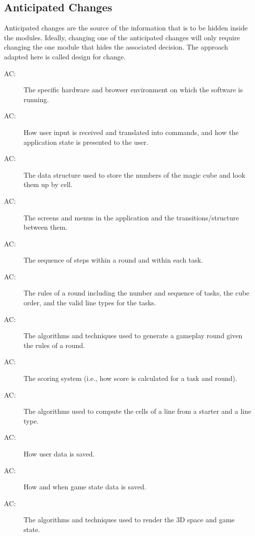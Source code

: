 \documentclass[12pt, titlepage]{article}
\newcounter{acnum}
\newcommand{\actheacnum}{AC\theacnum}
\begin{document}
\subsection{Anticipated Changes} \label{SecAchange}

Anticipated changes are the source of the information that is to be hidden
inside the modules. Ideally, changing one of the anticipated changes will only
require changing the one module that hides the associated decision. The approach
adapted here is called design for
change.

\begin{description}
\item [ \actheacnum \label{acHardware}:] The specific hardware and browser environment on which the software is running.
\item [ \actheacnum \label{acUI}:] How user input is received and translated into commands, and how the application state is presented to the user.
\item [ \actheacnum \label{acCR}:] The data structure used to store the numbers of the magic cube and look them up by cell.
\item [ \actheacnum \label{acN}:] The screens and menus in the application and the transitions/structure between them.
\item [ \actheacnum \label{acRC}:] The sequence of steps within a round and within each task.
\item [ \actheacnum \label{acR}:] The rules of a round including the number and sequence of tasks, the cube order, and the valid line types for the tasks.
\item [ \actheacnum \label{acRG}:] The algorithms and techniques used to generate a gameplay round given the rules of a round.
\item [ \actheacnum \label{acS}:] The scoring system (i.e., how score is calculated for a task and round).
\item [ \actheacnum \label{acTG}:] The algorithms used to compute the cells of a line from a starter and a line type.
\item [ \actheacnum \label{acUD}:] How user data is saved.
\item [ \actheacnum \label{acGD}:] How and when game state data is saved.
\item [ \actheacnum \label{acRE}:] The algorithms and techniques used to render the 3D space and game state.

\end{description}
\end{document}
